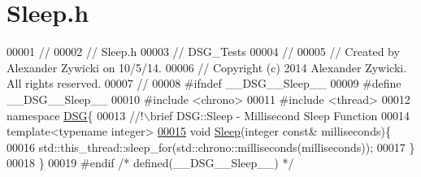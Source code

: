 \hypertarget{_sleep_8h_source}{\section{Sleep.\+h}
\label{_sleep_8h_source}
}

\begin{DoxyCode}
00001 \textcolor{comment}{//}
00002 \textcolor{comment}{//  Sleep.h}
00003 \textcolor{comment}{//  DSG\_Tests}
00004 \textcolor{comment}{//}
00005 \textcolor{comment}{//  Created by Alexander Zywicki on 10/5/14.}
00006 \textcolor{comment}{//  Copyright (c) 2014 Alexander Zywicki. All rights reserved.}
00007 \textcolor{comment}{//}
00008 \textcolor{preprocessor}{#ifndef \_\_DSG\_\_Sleep\_\_}
00009 \textcolor{preprocessor}{#define \_\_DSG\_\_Sleep\_\_}
00010 \textcolor{preprocessor}{#include <chrono>}
00011 \textcolor{preprocessor}{#include <thread>}
00012 \textcolor{keyword}{namespace }\hyperlink{namespace_d_s_g}{DSG}\{\textcolor{comment}{}
00013 \textcolor{comment}{    //!\(\backslash\)brief DSG::Sleep - Millisecond Sleep Function}
00014 \textcolor{comment}{}    \textcolor{keyword}{template}<\textcolor{keyword}{typename} \textcolor{keywordtype}{int}eger>
\hypertarget{_sleep_8h_source_l00015}{}\hyperlink{namespace_d_s_g_a012c968132bda114752f8ae012a1f441}{00015}     \textcolor{keywordtype}{void} \hyperlink{namespace_d_s_g_a012c968132bda114752f8ae012a1f441}{Sleep}(integer \textcolor{keyword}{const}& milliseconds)\{
00016         std::this\_thread::sleep\_for(std::chrono::milliseconds(milliseconds));
00017     \}
00018 \}
00019 \textcolor{preprocessor}{#endif }\textcolor{comment}{/* defined(\_\_DSG\_\_Sleep\_\_) */}\textcolor{preprocessor}{}
\end{DoxyCode}
